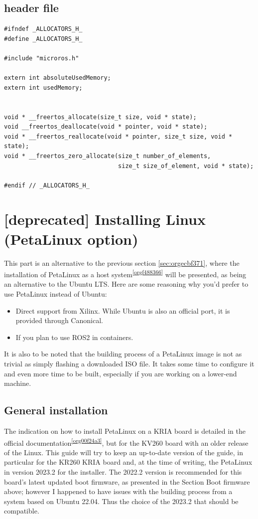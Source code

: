 \documentclass[10pt]{article}
\begin{document}
\inputminted[linenos, frame=single]{c}{./src/allocators.c}

\subsection{header file}
\label{sec:org4a2f589}
\begin{verbatim}
#ifndef _ALLOCATORS_H_
#define _ALLOCATORS_H_

#include "microros.h"

extern int absoluteUsedMemory;
extern int usedMemory;


void * __freertos_allocate(size_t size, void * state);
void __freertos_deallocate(void * pointer, void * state);
void * __freertos_reallocate(void * pointer, size_t size, void * state);
void * __freertos_zero_allocate(size_t number_of_elements,
                                size_t size_of_element, void * state);

#endif // _ALLOCATORS_H_
\end{verbatim}
\section{[deprecated] Installing Linux (PetaLinux option)}
\label{sec:org3b339c5}
This part is an alternative to the previous section \ref{sec:orgecbf371},
where the installation of PetaLinux as a host system\textsuperscript{\ref{orgf488366}} will be presented,
as being an alternative to the Ubuntu LTS. Here are some reasoning why you'd
prefer to use PetaLinux instead of Ubuntu:
\begin{itemize}
\item Direct support from Xilinx. While Ubuntu is also an official port, it is
provided through Canonical.
\item If you plan to use ROS2 in containers.
\end{itemize}

It is also to be noted that the building process of a PetaLinux image is not as
trivial as simply flashing a downloaded ISO file. It takes some time to
configure it and even more time to be built, especially if you are working on a
lower-end machine.

\subsection{General installation}
\label{sec:org57d6b62}
The indication on how to install PetaLinux on a KRIA board is detailed in the
official documentation\textsuperscript{\ref{org00f24a3}}, but for the KV260 board with an older release of
the Linux. This guide will try to keep an up-to-date version of the guide, in
particular for the KR260 KRIA board and, at the time of writing, the PetaLinux
in version 2023.2 for the installer.  The 2022.2 version is recommended for this
board's latest updated boot firmware, as presented in the Section Boot firmware
above; however I happened to have issues with the building process from a system
based on Ubuntu 22.04. Thus the choice of the 2023.2 that should be compatible.
\end{document}
